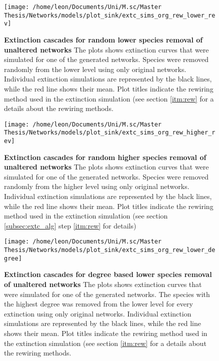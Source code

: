 \documentclass[12pt,a4paper]{article}
\begin{document}
\begin{figure}[H]
	 \centering
	 \texttt{[image: /home/leon/Documents/Uni/M.sc/Master Thesis/Networks/models/plot\_sink/extc\_sims\_org\_rew\_lower\_rev]}
	 \captionsetup{width = \textwidth}
	 \caption[Extinction cascades for random lower species removal of unaltered networks]{\textbf{Extinction cascades for random lower species removal of unaltered networks} The plots shows extinction curves that were simulated for one of the generated networks. Species were removed randomly from the lower level using only original networks. Individual extinction simulations are represented by the black lines, while the red line shows their mean. Plot titles indicate the rewiring method used in the extinction simulation (see section \ref{itm:rew} for a details about the rewiring methods.}
	 \label{fig:extc_org_rew_lower}
\end{figure}


\begin{figure}[H]
	 \centering
	 \texttt{[image: /home/leon/Documents/Uni/M.sc/Master Thesis/Networks/models/plot\_sink/extc\_sims\_org\_rew\_higher\_rev]}
	 \captionsetup{width = \textwidth}
	 \caption[Extinction cascades for random higher species removal of unaltered networks]{\textbf{Extinction cascades for random higher species removal of unaltered networks} The plots shows extinction curves that were simulated for one of the generated networks. Species were removed randomly from the higher level using only original networks. Individual extinction simulations are represented by the black lines, while the red line shows their mean. Plot titles indicate the rewiring method used in the extinction simulation (see section \ref{subsec:extc_alg} step \ref{itm:rew} for details)}
	 \label{fig:extc_org_rew_higher}
\end{figure}



\begin{figure}[H]
	 \centering
	 \texttt{[image: /home/leon/Documents/Uni/M.sc/Master Thesis/Networks/models/plot\_sink/extc\_sims\_org\_rew\_lower\_degree]}
	 \captionsetup{width = \textwidth}
	 \caption[Extinction cascades for degree based lower species removal of unaltered networks]{\textbf{Extinction cascades for degree based lower species removal of unaltered networks} The plots shows extinction curves that were simulated for one of the generated networks. The species with the highest degree was removed from the lower level for every extinction using only original networks. Individual extinction simulations are represented by the black lines, while the red line shows their mean. Plot titles indicate the rewiring method used in the extinction simulation (see section \ref{itm:rew} for a details about the rewiring methods.}
	 \label{fig:extc_org_rew_lower_deg}
\end{figure}
\end{document}
